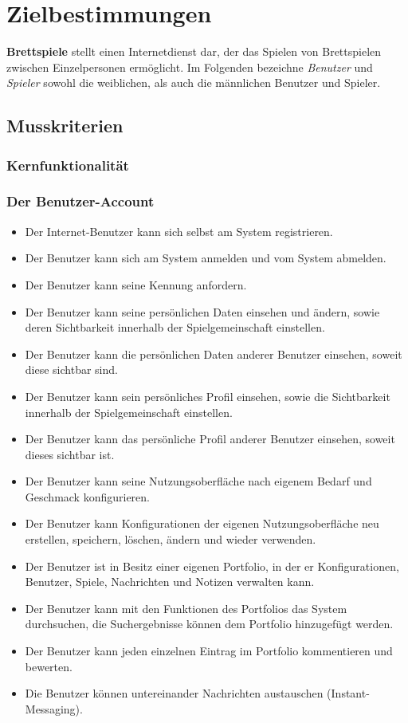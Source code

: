 \section{Zielbestimmungen}


\textbf{Brettspiele} stellt einen Internetdienst dar, der das Spielen von Brettspielen zwischen Einzelpersonen ermöglicht.
Im Folgenden bezeichne \textit{Benutzer} und \textit{Spieler} sowohl die weiblichen, als auch die männlichen Benutzer und Spieler.

\subsection{Musskriterien}

\subsubsection{Kernfunktionalität}

\subsubsection{Der Benutzer-Account}
\begin{itemize}
	\item Der Internet-Benutzer kann sich selbst am System registrieren.
	\item Der Benutzer kann sich am System anmelden und vom System abmelden.
	\item Der Benutzer kann seine Kennung anfordern.
	\item Der Benutzer kann seine persönlichen Daten einsehen und ändern, sowie deren Sichtbarkeit innerhalb der Spielgemeinschaft einstellen.
	\item Der Benutzer kann die persönlichen Daten anderer Benutzer einsehen, soweit diese sichtbar sind.
	\item Der Benutzer kann sein persönliches Profil einsehen, sowie die Sichtbarkeit innerhalb der Spielgemeinschaft einstellen.
	\item Der Benutzer kann das persönliche Profil anderer Benutzer einsehen, soweit dieses sichtbar ist.
	\item Der Benutzer kann seine Nutzungsoberfläche nach eigenem Bedarf und Geschmack konfigurieren.
	\item Der Benutzer kann Konfigurationen der eigenen Nutzungsoberfläche neu erstellen, speichern, löschen, ändern und wieder verwenden.
	\item Der Benutzer ist in Besitz einer eigenen Portfolio, in der er Konfigurationen, Benutzer, Spiele, Nachrichten und Notizen verwalten kann.
	\item Der Benutzer kann mit den Funktionen des Portfolios das System durchsuchen, die Suchergebnisse können dem Portfolio hinzugefügt werden.
	\item Der Benutzer kann jeden einzelnen Eintrag im Portfolio kommentieren und bewerten.
	\item Die Benutzer können untereinander Nachrichten austauschen (Instant-Messaging).
\end{itemize}

